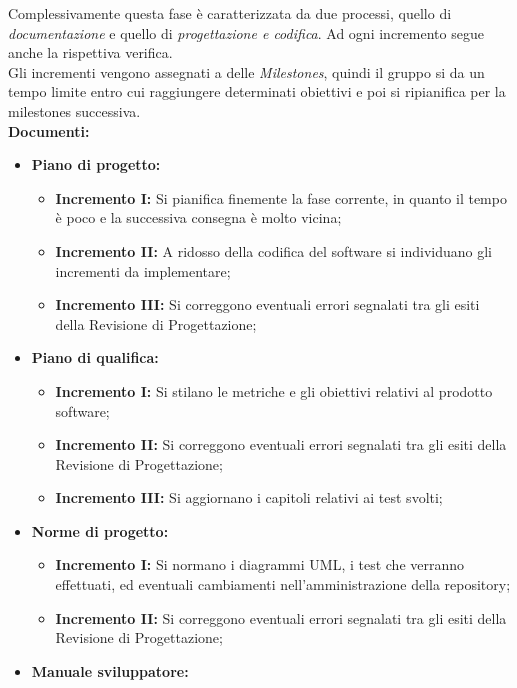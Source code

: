 \documentclass[../piano_di_progetto.tex]{subfiles}
\begin{document}
Complessivamente questa fase è caratterizzata da due processi, quello di \emph{documentazione} e quello di \emph{progettazione e codifica}. Ad ogni incremento segue anche la rispettiva verifica. \\
Gli incrementi vengono assegnati a delle \emph{Milestones}, quindi il gruppo si da un tempo limite entro cui raggiungere determinati obiettivi e poi si ripianifica per la 
milestones successiva.\\
\textbf{Documenti:}
\begin{itemize}
    \item \textbf{Piano di progetto:}
        \begin{itemize}
            \item \textbf{Incremento I:} Si pianifica finemente la fase corrente, in quanto il tempo è poco e la successiva consegna è molto vicina;
            \item \textbf{Incremento II:} A ridosso della codifica del software si individuano gli incrementi da implementare;
            \item \textbf{Incremento III:} Si correggono eventuali errori segnalati tra gli esiti della Revisione di Progettazione;
        \end{itemize}
        \item \textbf{Piano di qualifica:}
        \begin{itemize}
            \item \textbf{Incremento I:} Si stilano le metriche e gli obiettivi relativi al prodotto software;
            \item \textbf{Incremento II:} Si correggono eventuali errori segnalati tra gli esiti della Revisione di Progettazione;
            \item \textbf{Incremento III:} Si aggiornano i capitoli relativi ai test svolti;
        \end{itemize}
        \item \textbf{Norme di progetto:}
        \begin{itemize}
            \item \textbf{Incremento I:} Si normano i diagrammi UML, i test che verranno effettuati, ed eventuali cambiamenti nell'amministrazione della repository;
            \item \textbf{Incremento II:} Si correggono eventuali errori segnalati tra gli esiti della Revisione di Progettazione;
        \end{itemize}
        \item \textbf{Manuale sviluppatore:}

\end{itemize}
\end{document}
